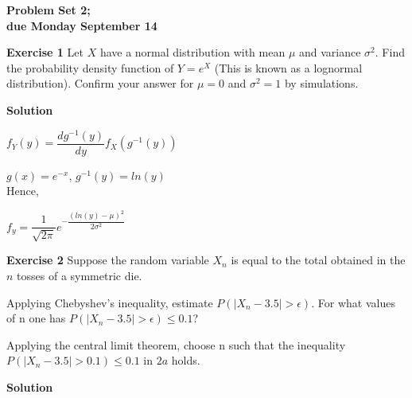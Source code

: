 \documentclass[12pt]{article}
\begin{document}


\begin{center}
\textbf{Problem Set 2;\\
due Monday September 14}
\end{center}

\bigskip
	
\textbf{Exercise 1}		
Let $X$ have a normal distribution with mean $\mu$ and variance $\sigma^2$. Find the 
probability density function of $Y = e^X$ (This is known as a lognormal distribution). 
Confirm your answer for $\mu = 0$ and $\sigma^2 = 1$ by simulations.
\medskip
		
\textbf{Solution}

$f_Y\left(y\right)=\dfrac{dg^{-1}\left(y\right)}{dy}f_X\left(g^{-1}\left(y\right)\right)$

$g\left(x\right)=e^{-x}$, $g^{-1}\left(y\right)=ln\left(y\right)$\\

Hence,

$f_{y}=\dfrac{1}{\sqrt{2\pi}}e^{-\dfrac{\left(ln\left(y\right)-\mu\right)^2}{2\sigma^2}}$

\bigskip

\textbf{Exercise 2}
Suppose the random variable $X_n$ is equal to the total obtained in the $n$ tosses of a symmetric die.
\begin{list}{()~}{}
\item Applying Chebyshev's inequality, estimate $P\left(\left|X_n - 3.5\right| > \epsilon\right)$. For what values of n one has $P\left(\left|X_n - 3.5\right| > \epsilon\right)\leq0.1$?
\item Applying the central limit theorem, choose n such that the inequality $P\left(\left|X_n - 3.5\right| > 0.1\right)\leq 0.1$ in $2a$ holds.
\end{list}

\medskip		

\textbf{Solution}
\end{document}
